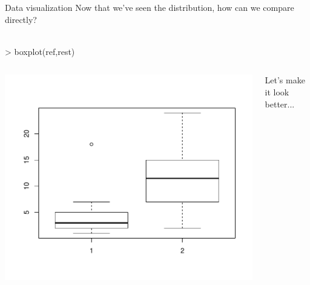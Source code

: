 \documentclass[xcolor=svgnames]{beamer}
\begin{document}
\begin{frame}[fragile]{Data visualization}
Now that we've seen the distribution, how can we compare directly?\\~\\
\begin{Schunk}
\begin{Sinput}
> boxplot(ref,rest)
\end{Sinput}
\end{Schunk}
\begin{columns}
\begin{column}{0.6\textwidth}
\begin{center}
\includegraphics[width=\textwidth,trim=0in 0in 0.3in 0.3in]{R_for_data_analysis-box.pdf}
\end{center}
\end{column}
\begin{column}{0.4\textwidth}
Let's make it look better...
\end{column}
\end{columns}
\end{frame}
\end{document}
